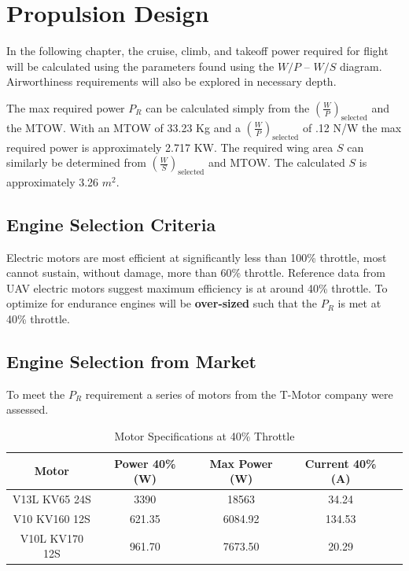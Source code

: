 \documentclass[12pt]{article}
\begin{document}
	\section{Propulsion Design}
	In the following chapter, the cruise, climb, and takeoff power required for flight will be calculated using the parameters found using the $W/P$ – $W/S$ diagram. Airworthiness requirements will also be explored in necessary depth.
	
	The max required power $P_R$ can be calculated simply from the $\left(\frac{W}{P}\right)_{\text{selected}}$ and the MTOW. With an MTOW of 33.23 Kg and a $\left(\frac{W}{P}\right)_{\text{selected}}$ of .12 N/W the max required power is approximately 2.717 KW. The required wing area $S$ can similarly be determined from $\left(\frac{W}{S}\right)_{\text{selected}}$ and MTOW. The calculated $S$ is approximately 3.26 $m^2$.
	
	\subsection{Engine Selection Criteria}
	Electric motors are most efficient at significantly less than 100\% throttle, most cannot sustain, without damage, more than 60\% throttle. Reference data from UAV electric motors suggest maximum efficiency is at around 40\% throttle. To optimize for endurance engines will be \textbf{over-sized} such that the ${P_R}$ is met at 40\% throttle.
	
	\subsection{Engine Selection from Market}
	To meet the $P_R$ requirement a series of motors from the T-Motor company were assessed.
	
	\begin{table}[h!]
		\centering
		\begin{tabular}{|c|c|c|c|c|}
			\hline
			\textbf{Motor} & \textbf{Power 40\% (W)} & \textbf{Max Power (W)} & \textbf{Current 40\% (A)} \\ \hline
			V13L KV65 24S  & 3390   & 18563  & 34.24  \\ \hline
			V10 KV160 12S  & 621.35 & 6084.92 & 134.53 \\ \hline
			V10L KV170 12S & 961.70 & 7673.50 & 20.29  \\ \hline
		\end{tabular}
		\caption{Motor Specifications at 40\% Throttle}
	\end{table}
	
\end{document}
